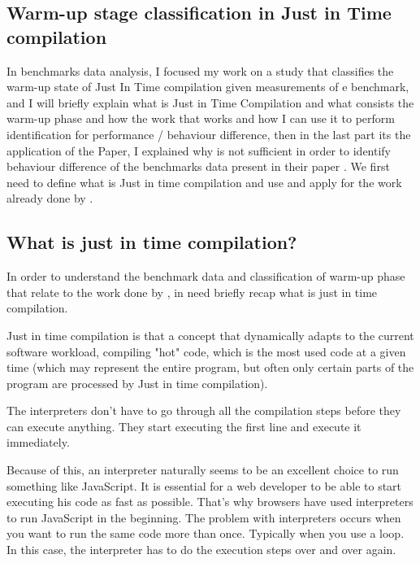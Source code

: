 \documentclass{article}
\begin{document}
\subsection{Warm-up stage classification in Just in Time compilation}

In benchmarks data analysis, I focused my work on a study that classifies the warm-up state of Just In Time compilation given measurements of e benchmark, and I will briefly explain what is Just in Time Compilation and what consists the warm-up phase and how the work that \citep{barrett2017virtual} works and how I can use it to perform identification for performance / behaviour difference, then in the last part its the application of the Paper, I explained why is not sufficient in order to identify behaviour difference of the benchmarks data  present in their paper . We first need to define what is Just in time compilation and use and apply for the work already done by \citep{barrett2017virtual}.



\subsection{What is just in time compilation? }


In order to understand the benchmark data and classification of warm-up phase that relate to the work done by \citep{barrett2017virtual}, in need briefly recap what is just in time compilation.

Just in time compilation \citep{aycock2003brief} is that a concept that dynamically adapts to the current software workload, compiling "hot" code, which is the most used code at a given time (which may represent the entire program, but often only certain parts of the program are processed by Just in time compilation).

The interpreters don't have to go through all the compilation steps before they can execute anything. They start executing the first line and execute it immediately.

Because of this, an interpreter naturally seems to be an excellent choice to run something like JavaScript. It is essential for a web developer to be able to start executing his code as fast as possible. That's why browsers have used interpreters to run JavaScript in the beginning.
The problem with interpreters occurs when you want to run the same code more than once. Typically when you use a loop. In this case, the interpreter has to do the execution steps over and over again.
\end{document}
